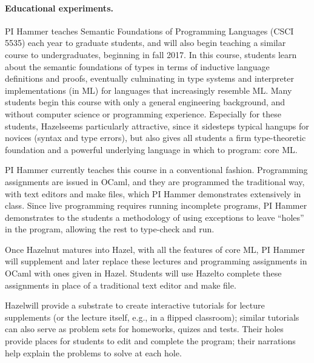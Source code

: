 \documentclass[letterpaper,USenglish]{lipics-v2016}
\newcommand{\Hazel}[0]{\textsf{Hazel}}
\begin{document}


\paragraph{Educational experiments.} 
%
PI Hammer teaches Semantic Foundations of Programming Languages (CSCI
5535) each year to graduate students, and will also begin teaching a
similar course to undergraduates, beginning in fall 2017.
%
In this course, students learn about the semantic foundations of types
in terms of inductive language definitions and proofs, eventually
culminating in type systems and interpreter implementations (in ML)
for languages that increasingly resemble ML.
%
Many students begin this course with only a general engineering
background, and without computer science or programming experience.
Especially for these students, \Hazel seems particularly attractive,
since it sidesteps typical hangups for novices (syntax and type
errors), but also gives all students a firm type-theoretic foundation
and a powerful underlying language in which to program: core ML.

PI Hammer currently teaches this course in a conventional fashion.
%
Programming assignments are issued in OCaml, and they are programmed
the traditional way, with text editors and make files, which PI Hammer
demonstrates extensively in class.
%
Since live programming requires running incomplete programs, PI Hammer
demonstrates to the students a methodology of using exceptions to
leave ``holes'' in the program, allowing the rest to type-check and
run.

Once Hazelnut matures into \Hazel, with all the features of core ML,
PI Hammer will supplement and later replace these lectures and
programming assignments in OCaml with ones given in \Hazel.
%
Students will use \Hazel to complete these assignments in place of a
traditional text editor and make file.

\Hazel will provide a
substrate to create interactive tutorials for lecture supplements (or
the lecture itself, e.g., in a flipped classroom); similar tutorials
can also serve as problem sets for homeworks, quizes and tests.
%
Their holes provide places for students to edit and complete the
program; their narrations help explain the problems to solve at each
hole.
\end{document}

